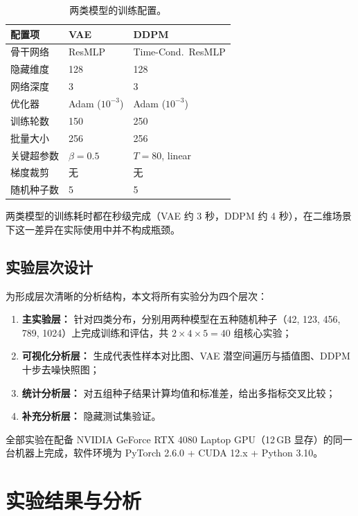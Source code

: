 \documentclass[UTF8,a4paper,12pt]{ctexart}
\begin{document}
\begin{table}[H]
\centering
\small
\caption{两类模型的训练配置。}
\label{tab:training-config}
\begin{tabular}{p{2.6cm}p{4.5cm}p{4.5cm}}
\toprule
配置项 & VAE & DDPM \\
\midrule
骨干网络 & ResMLP & Time-Cond.\ ResMLP \\
隐藏维度 & 128 & 128 \\
网络深度 & 3 & 3 \\
优化器 & Adam ($10^{-3}$) & Adam ($10^{-3}$) \\
训练轮数 & 150 & 250 \\
批量大小 & 256 & 256 \\
关键超参数 & $\beta{=}0.5$ & $T{=}80$, linear \\
梯度裁剪 & 无 & 无 \\
随机种子数 & 5 & 5 \\
\bottomrule
\end{tabular}
\end{table}

两类模型的训练耗时都在秒级完成（VAE 约 3 秒，DDPM 约 4 秒），在二维场景下这一差异在实际使用中并不构成瓶颈。

\subsection{实验层次设计}

为形成层次清晰的分析结构，本文将所有实验分为四个层次：

\begin{enumerate}
    \item \textbf{主实验层：} 针对四类分布，分别用两种模型在五种随机种子（42, 123, 456, 789, 1024）上完成训练和评估，共 $2\times4\times5=40$ 组核心实验；
    \item \textbf{可视化分析层：} 生成代表性样本对比图、VAE 潜空间遍历与插值图、DDPM 十步去噪快照图；
    \item \textbf{统计分析层：} 对五组种子结果计算均值和标准差，给出多指标交叉比较；
    \item \textbf{补充分析层：} 隐藏测试集验证。
\end{enumerate}

全部实验在配备 NVIDIA GeForce RTX 4080 Laptop GPU（12\,GB 显存）的同一台机器上完成，软件环境为 PyTorch 2.6.0 + CUDA 12.x + Python 3.10。

\section{实验结果与分析}
\end{document}
